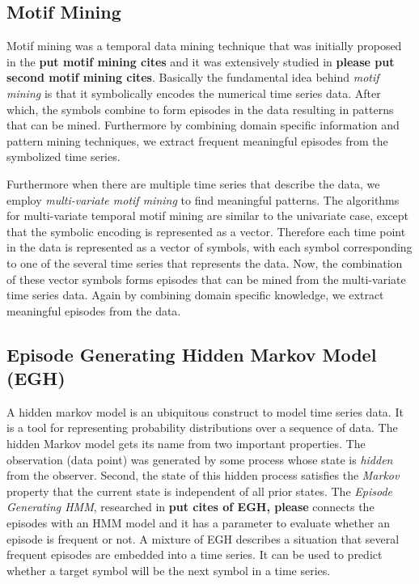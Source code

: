 \subsection{Motif Mining}
Motif mining was a temporal data mining technique that was initially proposed in the \textbf{put motif mining cites} and it was extensively studied in \textbf{please put second motif mining cites}. Basically the fundamental idea behind \emph{motif mining} is that it symbolically encodes the numerical time series data. After which, the symbols combine to form episodes in the data resulting in patterns that can be mined. Furthermore by combining domain specific information and pattern mining techniques, we extract frequent meaningful episodes from the symbolized time series.

Furthermore when there are multiple time series that describe the data, we employ \emph{multi-variate motif mining} to find meaningful patterns. The algorithms for multi-variate temporal motif mining are similar to the univariate case, except that the symbolic encoding is represented as a vector. Therefore each time point in the data is represented as a vector of symbols, with each symbol corresponding to one of the several time series that represents the data. Now, the combination of these vector symbols forms episodes that can be mined from the multi-variate time series data. Again by combining domain specific knowledge, we extract meaningful episodes from the data.



\subsection{Episode Generating Hidden Markov Model (EGH)} A hidden markov model is an ubiquitous construct to model time series data. It is a tool for representing probability distributions over a sequence of data. The hidden Markov model gets its name from two important properties. The observation (data point) was generated by some process whose state is \emph{hidden} from the observer. Second, the state of this hidden process satisfies the \emph{Markov} property that the current state is independent of all prior states. The \emph{Episode Generating HMM}, researched in \textbf{put cites of EGH, please} connects the episodes with an HMM model and it has a parameter to evaluate whether an episode is frequent or not. A mixture of EGH describes a situation that several frequent episodes are embedded into a time series. It can be used to predict whether a target symbol will be the next symbol in a time series.



